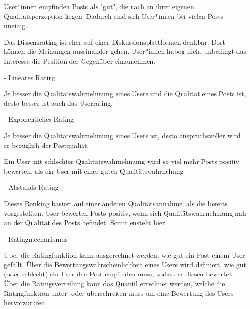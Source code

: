 User*innen empfinden Posts als "gut", die nach an ihrer eigenen Qualitätsperzeption liegen. Dadurch sind sich User*innen bei vielen Posts uneinig.

Das Dissensrating ist eher auf einer Diskussionsplattformen denkbar. Dort können die Meinungen auseinander gehen. User*innen haben nicht unbedingt das Interesse die Position der Gegenüber einzunehmen. 


- Lineares Rating

Je besser die Qualitätswahrnehmung eines Users und die Qualität eines Posts ist, desto besser ist auch das Userrating.


- Exponentielles Rating

Je besser die Qualitätswahrnehmung eines Users ist, desto anspruchsvoller wird er bezüglich der Postqualiät.

Ein User mit schlechter Qualitätswahrnehmung wird so viel mehr Posts  positiv bewerten, als ein User mit einer guten Qualitätswahrnehung



- Abstands Rating

Dieses Ranking basiert auf einer anderen Qualitätsannahme, als die bereits vorgestellten. User bewerten Posts positiv, wenn sich Qualitätswahrnehmung nah an der Qualität des Posts befindet. Somit ensteht hier 


- Ratingmechanismus


Über die Ratingfunktion kann ausgerechnet werden, wie gut ein Post einem User gefällt. Über die Bewertungswahrscheinlichkeit eines Users wird definiert, wie gut (oder schlecht) ein User den Post empfinden muss, sodass er diesen bewertet.  Über die Ratingsverteilung kann das Quantil errechnet werden, welche die Ratingfunktion unter- oder überschreiten muss um eine Bewertung des Users hervorzurufen.